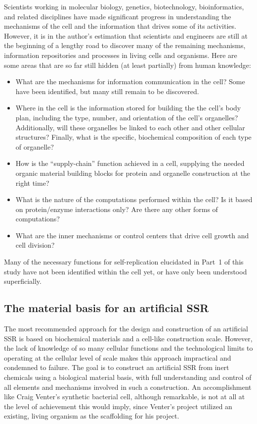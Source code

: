 Scientists working in molecular biology, genetics, biotechnology,
bioinformatics, and related disciplines have made significant progress
in understanding the mechanisms of the cell and the information that
drives some of its activities. However, it is in the author's estimation
that scientists and engineers are still
at the beginning of a lengthy road to discover many of the remaining
mechanisms, information repositories and processes in living cells and
organisms. Here are some areas that are so far still hidden (at least
partially) from human knowledge:

\begin{itemize}
\item What are the mechanisms for information communication in the cell?  Some have been identified, but many still remain to be discovered.
\item Where in the cell is the information 
stored for building the  the cell's body plan, including the type, number, and orientation of the cell's organelles?  Additionally, will these organelles be linked to each other and other cellular structures? Finally, what is the specific, biochemical composition of each type of organelle?
\item How is the “supply-chain” function achieved in a cell, supplying the needed organic material building blocks for
protein and organelle construction at the right time?
\item What is the nature of the computations performed within the cell? Is
it based on protein/enzyme interactions only? Are there any other
forms of computations?
\item What are the inner mechanisms or control centers that drive cell
growth and cell division?
\end{itemize}

Many of the necessary functions for self-replication
elucidated in Part~1 of this study have not been identified within
the cell yet, or have only been understood superficially.

\subsection{The material basis for an artificial SSR}

The most recommended approach for the design and construction of an
artificial SSR is based on biochemical materials and a
cell-like construction scale. However, the lack of knowledge of so many
cellular functions and the technological limits to
operating at the cellular level of scale makes this approach
impractical and condemned to failure. The goal is to construct
an artificial SSR from inert chemicals
using a biological material basis, with full understanding and control
of all elements and mechanisms involved in such a construction. An
accomplishment like Craig Venter’s synthetic bacterial cell, although
remarkable, is not at all at the level of achievement this would
imply, since Venter's project utilized an existing, living organism
as the scaffolding for his project.

